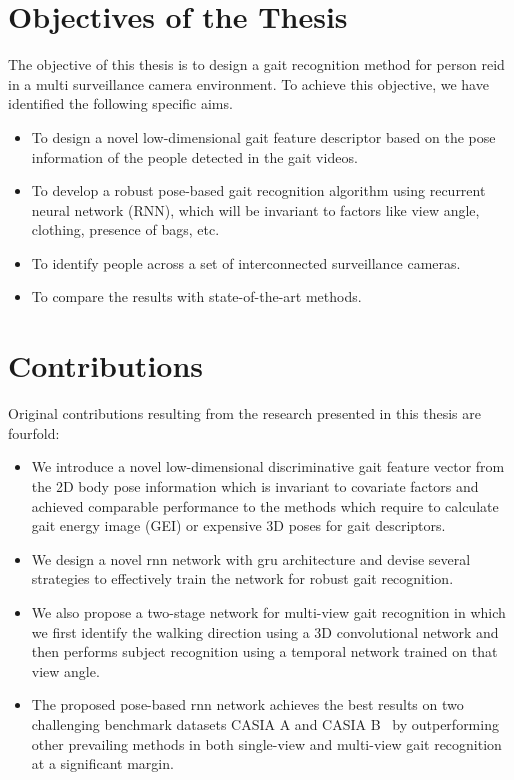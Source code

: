 \section{Objectives of the Thesis}
The objective of this thesis is to design a gait recognition method for person \gls{reid} in a multi surveillance camera environment. To achieve this objective, we have identified the following specific aims.

\begin{itemize}
\item To design a novel low-dimensional gait feature descriptor based on the pose information of the people detected in the gait videos. 

\item To develop a robust pose-based gait recognition algorithm using recurrent neural network (RNN), which will be invariant to factors like view angle, clothing, presence of bags, etc.

\item To identify people across a set of interconnected surveillance cameras.
\item To compare the results with state-of-the-art methods.
\end{itemize}



\section{Contributions}
Original contributions resulting from the research presented in this thesis are fourfold:
\begin{itemize}
\item We introduce a novel low-dimensional discriminative gait feature vector from the 2D body pose information which is invariant to covariate factors and achieved comparable performance to the methods which require to calculate gait energy image (GEI) or expensive 3D poses for gait descriptors.

\item We design a novel \gls{rnn} network with \gls{gru} architecture and devise several strategies to effectively train the network for robust gait recognition. 

\item We also propose a two-stage network for multi-view gait recognition in which we first identify the walking direction using a 3D convolutional network and then performs subject recognition using a temporal network trained on that view angle.

\item The proposed pose-based \gls{rnn} network achieves the best results on two challenging benchmark datasets CASIA A and CASIA B~\cite{Yu_06} by outperforming other prevailing methods in both single-view and multi-view gait recognition at a significant margin.
\end{itemize}



